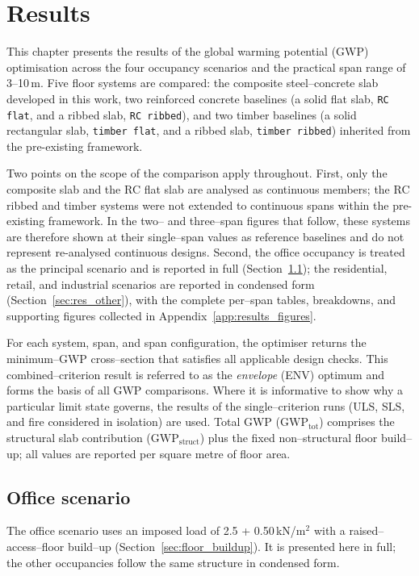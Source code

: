 \section{Results}
\label{fourthchapter}

\label{sec:res_intro}
This chapter presents the results of the global warming potential (GWP) optimisation across the four occupancy scenarios and the practical span range of 3--10\,m. Five floor systems are compared: the composite steel--concrete slab developed in this work, two reinforced concrete baselines (a solid flat slab, \texttt{RC flat}, and a ribbed slab, \texttt{RC ribbed}), and two timber baselines (a solid rectangular slab, \texttt{timber flat}, and a ribbed slab, \texttt{timber ribbed}) inherited from the pre-existing framework.

Two points on the scope of the comparison apply throughout. First, only the composite slab and the RC flat slab are analysed as continuous members; the RC ribbed and timber systems were not extended to continuous spans within the pre-existing framework. In the two-- and three--span figures that follow, these systems are therefore shown at their single--span values as reference baselines and do not represent re-analysed continuous designs. Second, the office occupancy is treated as the principal scenario and is reported in full (Section~\ref{sec:res_office}); the residential, retail, and industrial scenarios are reported in condensed form (Section~\ref{sec:res_other}), with the complete per--span tables, breakdowns, and supporting figures collected in Appendix~\ref{app:results_figures}.

For each system, span, and span configuration, the optimiser returns the minimum--GWP cross--section that satisfies all applicable design checks. This combined--criterion result is referred to as the \emph{envelope} (ENV) optimum and forms the basis of all GWP comparisons. Where it is informative to show why a particular limit state governs, the results of the single--criterion runs (ULS, SLS, and fire considered in isolation) are used. Total GWP (\(\mathrm{GWP}_\mathrm{tot}\)) comprises the structural slab contribution (\(\mathrm{GWP}_\mathrm{struct}\)) plus the fixed non--structural floor build--up; all values are reported per square metre of floor area.

\subsection{Office scenario}
\label{sec:res_office}
The office scenario uses an imposed load of 2.5 + 0.50\,kN/m$^2$ with a raised--access--floor build--up (Section~\ref{sec:floor_buildup}). It is presented here in full; the other occupancies follow the same structure in condensed form.

